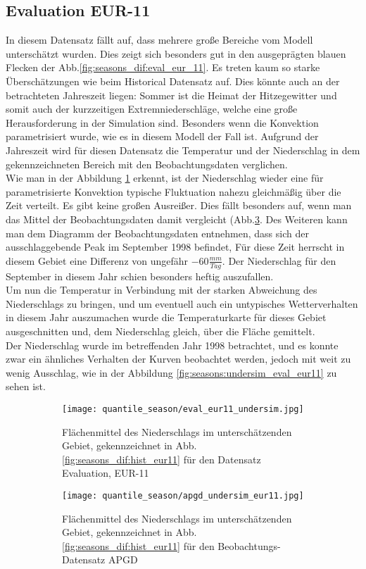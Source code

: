 \subsection{Evaluation EUR-11}\label{sec:eval_eur_11}
In diesem Datensatz fällt auf, dass mehrere große Bereiche vom Modell unterschätzt wurden. Dies zeigt sich besonders gut in den ausgeprägten blauen Flecken der Abb.\ref{fig:seasons_dif:eval_eur_11}. Es treten kaum so starke Überschätzungen wie beim Historical Datensatz auf. Dies könnte auch an der betrachteten Jahreszeit liegen: Sommer ist die Heimat der Hitzegewitter und somit auch der kurzzeitigen Extremniederschläge, welche eine große Herausforderung in der Simulation sind. Besonders wenn die Konvektion parametrisiert wurde, wie es in diesem Modell der Fall ist. Aufgrund der Jahreszeit wird für diesen Datensatz die Temperatur und der Niederschlag in dem gekennzeichneten Bereich mit den Beobachtungsdaten verglichen.\\
Wie man in der Abbildung \ref{fig:season:under_eval_eur11} erkennt, ist der Niederschlag wieder eine für parametrisierte Konvektion typische Fluktuation nahezu gleichmäßig über die Zeit verteilt. Es gibt keine großen Ausreißer. Dies fällt besonders auf, wenn man das Mittel der Beobachtungsdaten damit vergleicht (Abb.\ref{fig:season:under_apgd_eur11}. Des Weiteren kann man dem Diagramm der Beobachtungsdaten entnehmen, dass sich der ausschlaggebende Peak im September 1998 befindet, Für diese Zeit herrscht in diesem Gebiet eine Differenz von ungefähr $-60\frac{mm}{Tag}$. Der Niederschlag für den September in diesem Jahr schien besonders heftig auszufallen.\\
Um nun die Temperatur in Verbindung mit der starken Abweichung des Niederschlags zu bringen, und um eventuell auch ein untypisches Wetterverhalten in diesem Jahr auszumachen wurde die Temperaturkarte für dieses Gebiet ausgeschnitten und, dem Niederschlag gleich, über die Fläche gemittelt.\\
Der Niederschlag wurde im betreffenden Jahr 1998 betrachtet, und es konnte zwar ein ähnliches Verhalten der Kurven beobachtet werden, jedoch mit weit zu wenig Ausschlag, wie in der Abbildung \ref{fig:seasons:undersim_eval_eur11} zu sehen ist.
\begin{figure}[h]
	\begin{subfigure}{0.49\textwidth}
		\texttt{[image: quantile\_season/eval\_eur11\_undersim.jpg]}
		\caption{Flächenmittel des Niederschlags im unterschätzenden Gebiet, gekennzeichnet in Abb.\ref{fig:seasons_dif:hist_eur11} für den Datensatz Evaluation, EUR-11}
		\label{fig:season:under_eval_eur11}
	\end{subfigure}
	\begin{subfigure}{0.49\textwidth}
		\texttt{[image: quantile\_season/apgd\_undersim\_eur11.jpg]}
		\caption{Flächenmittel des Niederschlags im unterschätzenden Gebiet, gekennzeichnet in Abb.\ref{fig:seasons_dif:hist_eur11} für den Beobachtungs-Datensatz APGD}
		\label{fig:season:under_apgd_eur11}
	\end{subfigure}
	\caption{}
\end{figure}
